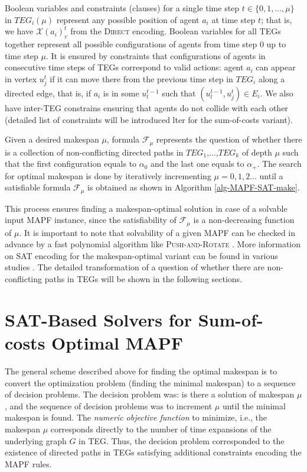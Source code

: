 \documentclass[jair,oneside,11pt]{article}
\begin{document}
Boolean variables and constraints (clauses) for a single time step $t \in \{0,1,...,\mu\}$ in $TEG_i(\mu)$ represent any possible position of agent $a_i$ at time step $t$; that is, we have $\mathcal{X}(a_i)_v^t$ from the \textsc{Direct} encoding. Boolean variables for all TEGs together represent all possible configurations of agents from time step $0$ up to time step $\mu$. It is ensured by constraints that configurations of agents in consecutive time steps of TEGs correspond to valid actions: agent $a_i$ can appear in vertex $u_j^t$ if it can move there from the previous time step in $TEG_i$ along a directed edge, that is, if $a_i$ is in some $u_l^{t-1}$ such that $(u_l^{t-1},u_j^t) \in E_i$. We also have inter-TEG constrains ensuring that agents do not collide with each other (detailed list of constraints will be introduced lter for the sum-of-costs variant).

Given a desired makespan $\mu$, formula $\mathcal{F}_{\mu}$ represents the question of whether there is a collection of non-conflicting directed paths in $TEG_1$,...,$TEG_k$ of depth $\mu$ such that the first configuration equals to $\alpha_0$ and the last one equals to $\alpha_+$. The search for optimal makespan is done by iteratively incrementing $\mu=0,1,2...$ until a satisfiable formula $\mathcal{F}_{\mu}$ is obtained as shown in Algorithm \ref{alg-MAPF-SAT-make}.

This process ensures finding a makespan-optimal solution in case of a solvable input MAPF instance, since the satisfiability of $\mathcal{F}_{\mu}$ is a non-decreasing function of $\mu$. It is important to note that solvability of a given MAPF can be checked in advance by a fast polynomial algorithm like \textsc{Push-and-Rotate} \cite{DBLP:conf/atal/WildeMW13}. More information on SAT encoding for the makespan-optimal variant can be found in various studies \cite{DBLP:conf/ictai/Surynek14,DBLP:conf/pricai/Surynek14,DBLP:conf/micai/Surynek14}. The detailed transformation of a question of whether there are non-conflicting paths in TEGs will be shown in the following sections.

\section{SAT-Based Solvers for Sum-of-costs Optimal MAPF}
\noindent The general scheme described above for finding the optimal makespan is to convert the optimization problem (finding the minimal makespan) to a sequence of decision problems. The decision problem was: is there a solution of makespan $\mu$, and the sequence of decision problems was to increment $\mu$ until the minimal makespan is found. The {\em numeric objective function} to minimize, i.e., the makespan $\mu$ corresponds directly to the number of time expansions of the underlying graph $G$ in TEG. Thus, the decision problem corresponded to the existence of directed paths in TEGs satisfying additional constraints encoding the MAPF rules.
\end{document}
